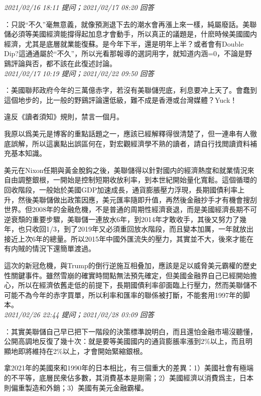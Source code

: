\documentclass[twocolumn]{ctexart}
\begin{document}
\textit{\hfill\noindent\small 2021/02/16 18:11 提问；2021/02/17 08:20 回答}

：只説“不久”毫無意義，就像預測退下去的潮水會再漲上來一樣，純屬廢話。美聯儲必須等美國經濟能撐得起加息才會動手，所以真正的議題是，什麽時候美國國内經濟，尤其是底層就業能復蘇。是今年下半，還是明年上半？或者會有Double Dip?這通通屬於“不久”，所以光看那報導的選詞用字，就知道内涵=0，不論是野鷄評論與否，都不該在此復述討論。
\\

\textit{\hfill\noindent\small 2021/02/17 10:19 提问；2021/02/22 09:50 回答}

：美國聯邦政府今年的三萬億赤字，若沒有美聯儲兜底，利息要冲上天了。會蠢到這個地步的，比一般的野鷄評論還低級，難不成是香港或台灣媒體？Yuck！

違反《讀者須知》規則，禁言一個月。


我原以爲美元是博客的重點話題之一，應該已經解釋得很清楚了，但一連串有人徹底誤解，所以這裏點出誤區何在，對宏觀經濟學不熟的讀者，請自行找閲讀資料補充基本知識。

美元在Nixon任期與黃金脫鈎之後，美聯儲得以針對國内的經濟熱度和就業情況來自由調整銀根，一開始是控制短期收放利率，到本世紀開始量化寬鬆。這個循環的回收階段，一般始於美國GDP加速成長，通貨膨脹壓力浮現，長期國債利率上升，然後美聯儲做出政策因應，美元匯率隨即升值，再然後金融抄手才有機會搜刮世界。但2008年的金融危機，不是普通的周期性經濟衰退，而是美國經濟長期不可逆衰頹的重要步驟，美聯儲一連放水6年，到2014年才敢收手，其後又努力了幾年，也只收回1/3，到了2019年又必須重回放水階段，而且變本加厲，一年就放出接近上次6年的總量。所以2015年中國外匯流失的壓力，其實並不大，後來才能在有内賊的情況下還簡單渡過。

這次的新冠危機，與Trump的倒行逆施互相叠加，應該是足以威脅美元霸權的歷史性關鍵事件。雖然雪崩的確實時間點無法預先確定，但美國金融界自己已經開始擔心，所以在經濟依舊走低的前提下，長期國債利率卻面臨上行壓力，然而美聯儲不可能不為今年的赤字買單，所以利率和匯率的聯係被打斷，不能套用1997年的脚本。
\\

\textit{\hfill\noindent\small 2021/02/26 22:44 提问；2021/02/28 03:09 回答}

：其實美聯儲自己早已把下一階段的決策標準說明白，而且還怕金融市場沒聽懂，公開高調地反復了幾十次：就是要等美國國内的通貨膨脹率漲到2\%以上，而且明顯地即將維持在2\%以上，才會開始緊縮銀根。

拿2021年的美國來和1990年的日本相比，有三個重大的差異：1）美國社會有極端的不平等，底層民衆佔多數，其消費基本是剛需；2）美國經濟以消費爲主，日本則偏重製造和外銷；3）美國有美元金融霸權。
\end{document}
